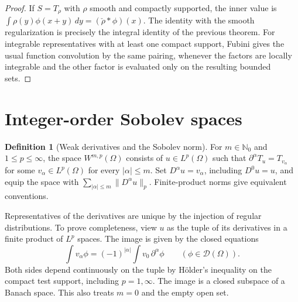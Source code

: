 \documentclass[11pt,oneside,openany]{book}
\theoremstyle{definition}
\newtheorem{definition}[theorem]{Definition}
\theoremstyle{remark}
\begin{document}
\begin{proof}
If \(S=T_\rho\) with \(\rho\) smooth and compactly supported, the inner value is \(\int\rho(y)\phi(x+y)\,dy=(\check\rho*\phi)(x)\). The identity with the smooth regularization is precisely the integral identity of the previous theorem. For integrable representatives with at least one compact support, Fubini gives the usual function convolution by the same pairing, whenever the factors are locally integrable and the other factor is evaluated only on the resulting bounded sets.
\end{proof}

\section{Integer-order Sobolev spaces}

\begin{definition}[Weak derivatives and the Sobolev norm]
\label{p102:AN-11-C04-R01}
For \(m\in\mathbb N_0\) and \(1\leq p\leq\infty\), the space \(W^{m,p}(\Omega)\) consists of \(u\in L^p(\Omega)\) such that \(\partial^\alpha T_u=T_{v_\alpha}\) for some \(v_\alpha\in L^p(\Omega)\) for every \(|\alpha|\leq m\). Set \(D^\alpha u=v_\alpha\), including \(D^0u=u\), and equip the space with \(\sum_{|\alpha|\leq m}\|D^\alpha u\|_p\). Finite-product norms give equivalent conventions.
\end{definition}

Representatives of the derivatives are unique by the injection of regular distributions. To prove completeness, view \(u\) as the tuple of its derivatives in a finite product of \(L^p\) spaces. The image is given by the closed equations
\[
 \int v_\alpha\phi=(-1)^{|\alpha|}\int v_0\,\partial^\alpha\phi
 \qquad(\phi\in\mathcal D(\Omega)).
\]
Both sides depend continuously on the tuple by H\"older's inequality on the compact test support, including \(p=1,\infty\). The image is a closed subspace of a Banach space. This also treats \(m=0\) and the empty open set.
\end{document}
